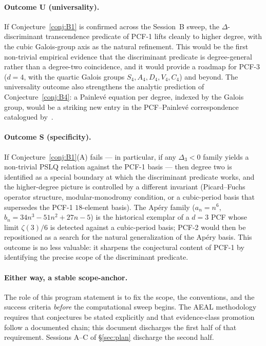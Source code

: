 \documentclass[11pt,a4paper]{article}
\theoremstyle{definition}
\theoremstyle{remark}
\begin{document}
\paragraph{Outcome U (universality).}
If Conjecture~\ref{conj:B1} is confirmed across the Session~B sweep,
the $\Delta$-discriminant transcendence predicate of PCF-1 lifts cleanly
to higher degree, with the cubic Galois-group axis as the natural
refinement. This would be the first non-trivial empirical evidence that
the discriminant predicate is degree-general rather than a degree-two
coincidence, and it would provide a roadmap for PCF-3 ($d=4$, with the
quartic Galois groups $S_{4}, A_{4}, D_{4}, V_{4}, C_{4}$) and beyond.
The universality outcome also strengthens the analytic prediction of
Conjecture~\ref{conj:B4}: a Painlev\'e equation per degree, indexed by
the Galois group, would be a striking new entry in the
PCF--Painlev\'e correspondence catalogued by~\cite{Mazzocco2003}.

\paragraph{Outcome S (specificity).}
If Conjecture~\ref{conj:B1}(A) fails --- in particular, if any
$\Delta_{3}<0$ family yields a non-trivial PSLQ relation against the
PCF-1 basis --- then degree two is identified as a special boundary at
which the discriminant predicate works, and the higher-degree picture is
controlled by a different invariant (Picard--Fuchs operator structure,
modular-monodromy condition, or a cubic-period basis that supersedes
the PCF-1 $18$-element basis). The Ap\'ery family
($a_{n}=n^{6}$, $b_{n}=34n^{3}-51n^{2}+27n-5$) is the historical exemplar
of a $d=3$ PCF whose limit $\zeta(3)/6$ is detected against a cubic-period
basis; PCF-2 would then be repositioned as a search for the natural
generalization of the Ap\'ery basis. This outcome is no less valuable: it
sharpens the conjectural content of PCF-1 by identifying the precise
scope of the discriminant predicate.

\paragraph{Either way, a stable scope-anchor.}
The role of this program statement is to fix the scope, the conventions,
and the success criteria \emph{before} the computational sweep begins.
The AEAL methodology requires that conjectures be stated explicitly and
that evidence-class promotion follow a documented chain; this document
discharges the first half of that requirement. Sessions A--C of
\S\ref{sec:plan} discharge the second half.
\end{document}
